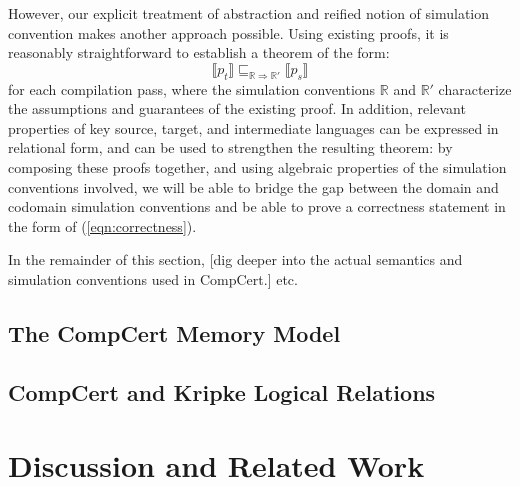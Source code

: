 \documentclass{article}
\begin{document}
However,
our explicit treatment of abstraction
and reified notion of simulation convention
makes another approach possible.
Using existing proofs, it is reasonably straightforward
to establish a theorem of the form:
\begin{equation}
    \label{correctness-alt}
    \llbracket p_t \rrbracket
    \sqsubseteq_{\mathbb{R} \Rightarrow \mathbb{R}'}
    \llbracket p_s \rrbracket
\end{equation}
for each compilation pass,
where the simulation conventions $\mathbb{R}$ and $\mathbb{R}'$
characterize the assumptions and guarantees
of the existing proof.
In addition,
relevant properties of key source, target, and intermediate languages
can be expressed in relational form,
and can be used to strengthen the resulting theorem:
by composing these proofs together,
and using algebraic properties of
the simulation conventions involved,
we will be able to bridge the gap
between the domain and codomain simulation conventions
and be able to prove a correctness statement
in the form of (\ref{eqn:correctness}).

In the remainder of this section,
[dig deeper into the actual semantics and
simulation conventions used in CompCert.]
etc.


\subsection{The CompCert Memory Model} %


\subsection{CompCert and Kripke Logical Relations} %



\section{Discussion and Related Work} %




\end{document}
